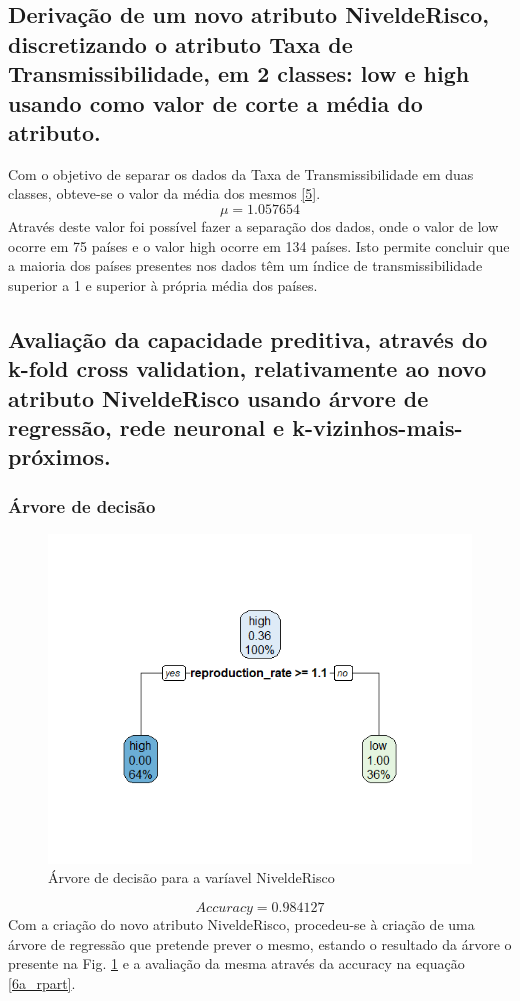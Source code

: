 \documentclass[conference]{IEEEtran}
\begin{document}
\subsection{Derivação de um novo atributo NiveldeRisco, discretizando o atributo Taxa de Transmissibilidade, em 2 classes: low e high usando como valor de corte a média do atributo.}
\label{ex05}
Com o objetivo de separar os dados da Taxa de Transmissibilidade em duas classes, obteve-se o valor da média dos mesmos \eqref{5}.
\begin{equation}
\mu = 1.057654\label{5}
\end{equation}
Através deste valor foi possível fazer a separação dos dados, onde o valor de low ocorre em 75 países e o valor high ocorre em 134 países. Isto permite concluir que a maioria dos países presentes nos dados têm um índice de transmissibilidade superior a 1 e superior à própria média dos países.


\subsection{Avaliação da capacidade preditiva, através do k-fold cross validation, relativamente ao novo atributo NiveldeRisco usando árvore de regressão, rede neuronal e k-vizinhos-mais-próximos.}
\subsubsection{Árvore de decisão}
\begin{figure}[htbp]
\centerline{\includegraphics[width=0.95\columnwidth]{images/06_1.png}}
\caption{Árvore de decisão para a varíavel NiveldeRisco}
\label{6a_rpart}
\end{figure}
\begin{equation}
Accuracy = 0.984127\label{6a_accuracy}
\end{equation}
Com a criação do novo atributo NiveldeRisco, procedeu-se à criação de uma árvore de regressão que pretende prever o mesmo, estando o resultado da árvore o presente na Fig. \ref{6a_rpart} e a avaliação da mesma através da accuracy na equação \eqref{6a_rpart}.
\end{document}
